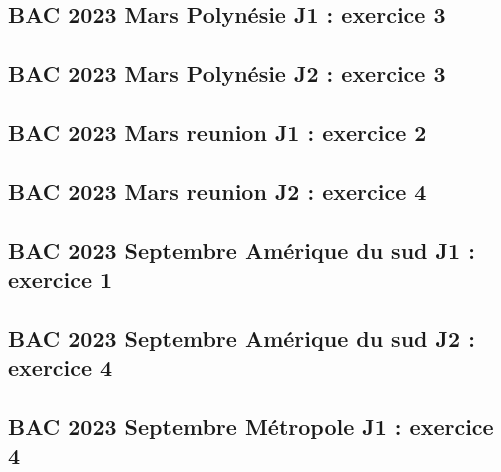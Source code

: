 \documentclass[lang=fr,edition=teacher,layout=sheet]{mxbook}
\begin{document}
\subsection*{BAC 2023 Mars Polynésie J1 : exercice 3}
\begingroup\endgroup
\par\bigskip
{}\subsection*{BAC 2023 Mars Polynésie J2 : exercice 3}
\begingroup\endgroup
\par\bigskip
{}\subsection*{BAC 2023 Mars reunion J1 : exercice 2}
\begingroup\endgroup
\par\bigskip
{}\subsection*{BAC 2023 Mars reunion J2 : exercice 4}
\begingroup\endgroup
\par\bigskip
{}\subsection*{BAC 2023 Septembre Amérique du sud J1 : exercice 1}
\begingroup\endgroup
\par\bigskip
{}\subsection*{BAC 2023 Septembre Amérique du sud J2 : exercice 4}
\begingroup\endgroup
\par\bigskip
{}\subsection*{BAC 2023 Septembre Métropole J1 : exercice 4}
\end{document}
